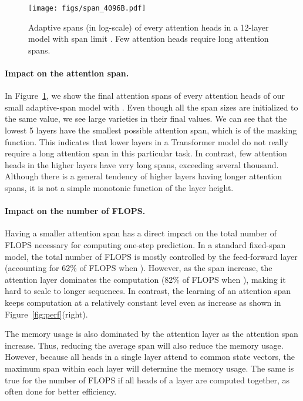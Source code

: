 \documentclass[11pt,a4paper]{article}
\newcommand{\fig}[1]{Figure~\ref{fig:#1}}
\begin{document}
\begin{figure}
\centering
\texttt{[image: figs/span\_4096B.pdf]} \\
\caption{
Adaptive spans (in log-scale) of every attention heads in a 12-layer model with span limit . Few attention heads require long attention spans.}
\vspace{-4mm}
\label{fig:span4096}
\end{figure}

\paragraph{Impact on the attention span.}
In \fig{span4096}, we show the final attention spans of every attention heads of our small adaptive-span model with .
Even though all the span sizes are initialized to the same value, we see large varieties in their final values.
We can see that the lowest 5 layers have the smallest possible attention span, which is  of the masking function.
This indicates that lower layers in a Transformer model do not really require a long attention span in this particular task.
In contrast, few attention heads in the higher layers have very long spans, exceeding several thousand.
Although there is a general tendency of higher layers having longer attention spans, it is not a simple monotonic function of the layer height.


\paragraph{Impact on the number of FLOPS.}
Having a smaller attention span has a direct impact on the total number of FLOPS necessary for computing one-step prediction.
In a standard fixed-span model, the total number of FLOPS is mostly controlled by the feed-forward layer (accounting for 62\% of FLOPS when ). However, as the span increase, the attention layer dominates the computation (82\% of FLOPS when ), making it hard to scale to longer sequences. In contrast, the learning of an attention span keeps computation at a relatively constant level even as  increase as shown in \fig{perf}(right).

The memory usage is also dominated by the attention layer as the attention span increase. Thus, reducing the average span will also reduce the memory usage. However, because all heads in a single layer attend to common state vectors, the maximum span within each layer will determine the memory usage. The same is true for the number of FLOPS if all heads of a layer are computed together, as often done for better efficiency.
\end{document}
